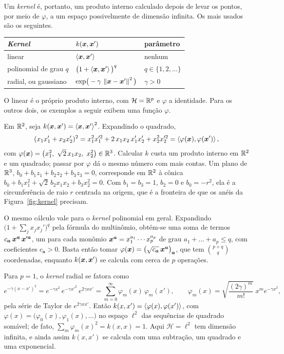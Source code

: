 \documentclass[11pt,a4paper]{article}
\begin{document}
Um \emph{kernel} é, portanto, um produto interno calculado depois de levar os pontos,
por meio de $\varphi$, a um espaço possivelmente de dimensão infinita. Os mais usados
são os seguintes.
\begin{center}\small
\renewcommand{\arraystretch}{1.4}
\begin{tabular}{@{}lll@{}}
\toprule
\emph{Kernel} & $k(\bm{x},\bm{x}')$ & parâmetro \\
\midrule
linear & $\left\langle \bm{x}, \bm{x}' \right\rangle$ & nenhum \\
polinomial de grau $q$ & $\big(1+\left\langle \bm{x}, \bm{x}' \right\rangle\big)^{q}$ & $q\in\{1,2,\dots\}$ \\
radial, ou gaussiano & $\exp\!\big(-\gamma\,\left\lVert \bm{x}-\bm{x}' \right\rVert^2\big)$ & $\gamma>0$ \\
\bottomrule
\end{tabular}
\end{center}
O linear é o próprio produto interno, com $\mathcal H=\mathbb{R}^p$ e $\varphi$ a identidade.
Para os outros dois, os exemplos a seguir exibem uma função $\varphi$.

\begin{exemplo}\label{ex:quad}
Em $\mathbb{R}^2$, seja $k(\bm{x},\bm{x}')=\left\langle \bm{x}, \bm{x}' \right\rangle^2$. Expandindo o quadrado,
\[
  (x_1x_1'+x_2x_2')^2=x_1^2x_1'^2+2\,x_1x_2\,x_1'x_2'+x_2^2x_2'^2
  =\left\langle \varphi(\bm{x}), \varphi(\bm{x}') \right\rangle,
\]
com $\varphi(\x)=\big(x_1^2,\ \sqrt2\,x_1x_2,\ x_2^2\big)\in\R^3$. Calcular $k$ custa
um produto interno em $\mathbb{R}^2$ e um quadrado; passar por $\varphi$ dá o mesmo número
com mais contas. Um plano de $\mathbb{R}^3$, $b_0+b_1z_1+b_2z_2+b_3z_3=0$,
corresponde em $\mathbb{R}^2$ à cônica $b_0+b_1x_1^2+\sqrt2\,b_2x_1x_2+b_3x_2^2=0$. Com
$b_1=b_3=1$, $b_2=0$ e $b_0=-r^2$, ela é a circunferência de raio $r$ centrada na
origem, que é a fronteira de que os anéis da Figura~\ref{fig:kernel} precisam.
\end{exemplo}

O mesmo cálculo vale para o \emph{kernel} polinomial em geral. Expandindo
$\big(1+\sum_jx_jx_j'\big)^q$ pela fórmula do multinômio, obtém-se uma soma de termos
$c_{\bm a}\,\bm{x}^{\bm a}\,\bm{x}'^{\bm a}$, um para cada monômio
$\bm{x}^{\bm a}=x_1^{a_1}\cdots x_p^{a_p}$ de grau $a_1+\dots+a_p\le q$, com coeficientes
$c_{\bm a}>0$. Basta então tomar
$\varphi(\bm{x})=\big(\sqrt{c_{\bm a}}\,\bm{x}^{\bm a}\big)_{\bm a}$, que tem $\binom{p+q}{q}$
coordenadas, enquanto $k(\bm{x},\bm{x}')$ se calcula com cerca de $p$ operações.

\begin{exemplo}\label{ex:rbf}
Para $p=1$, o \emph{kernel} radial se fatora como
\[
  e^{-\gamma(x-x')^2}=e^{-\gamma x^2}\,e^{-\gamma x'^2}\,e^{2\gamma xx'}
  =\sum_{m=0}^\infty\varphi_m(x)\,\varphi_m(x'),
  \qquad
  \varphi_m(x)=\sqrt{\frac{(2\gamma)^m}{m!}}\;x^m e^{-\gamma x^2},
\]
pela série de Taylor de $e^{2\gamma xx'}$. Então $k(x,x')=\left\langle \varphi(x), \varphi(x') \right\rangle$,
com $\varphi(x)=\big(\varphi_0(x),\varphi_1(x),\dots\big)$ no espaço $\ell^2$ das
sequências de quadrado somável; de fato, $\sum_m\varphi_m(x)^2=k(x,x)=1$. Aqui
$\mathcal H=\ell^2$ tem dimensão infinita, e ainda assim $k(x,x')$ se calcula com uma
subtração, um quadrado e uma exponencial.
\end{exemplo}
\end{document}
